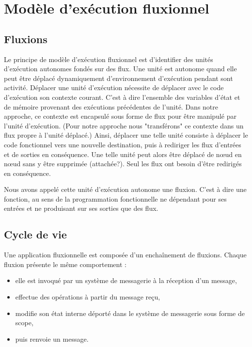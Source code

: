 \section{Modèle d'exécution fluxionnel}

	\subsection{Fluxions}

	Le principe de modèle d'exécution fluxionnel est d'identifier des unités d'exécution autonomes fondés sur des flux.
	Une unité est autonome quand elle peut être déplacé dynamiquement d'environnement d'exécution pendant sont activité.
	Déplacer une unité d'exécution nécessite de déplacer avec le code d'exécution son contexte courant. C'est à dire l'ensemble des variables d'état et de mémoire provenant des exécutions précédentes de l'unité.
	Dans notre approche, ce contexte est encapsulé sous forme de flux pour être manipulé par l'unité d'exécution.
	(Pour notre approche nous "transférons" ce contexte dans un flux propre à l'unité déplacé.)
	Ainsi, déplacer une telle unité consiste à déplacer le code fonctionnel vers une nouvelle destination, puis à rediriger les flux d'entrées et de sorties en conséquence. Une telle unité peut alors être déplacé de nœud en nœud sans y être supprimée (attachée?).
	Seul les flux ont besoin d'être redirigés en conséquence.

	Nous avons appelé cette unité d'exécution autonome une fluxion. C'est à dire une fonction, au sens de la programmation fonctionnelle ne dépendant pour ses entrées et ne produisant sur ses sorties que des flux.

	\subsection{Cycle de vie}

		Une application fluxionnelle est composée d'un enchaînement de fluxions.
		Chaque fluxion présente le même comportement : 
		\begin{itemize}
			\item elle est invoqué par un système de messagerie à la réception d'un message,
			\item effectue des opérations à partir du message reçu,
			\item modifie son état interne déporté dans le système de messagerie sous forme de scope,
			\item  puis renvoie un message.
		\end{itemize}

